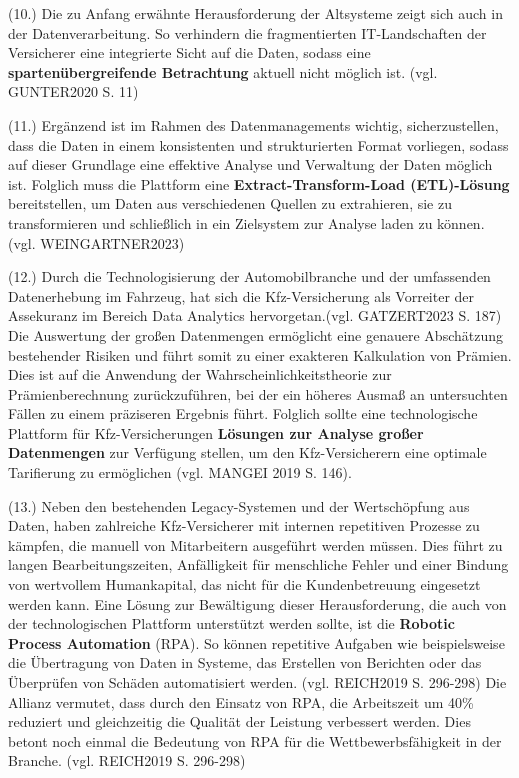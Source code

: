 (10.) Die zu Anfang erwähnte Herausforderung der Altsysteme zeigt sich auch in der Datenverarbeitung. So verhindern die fragmentierten IT-Landschaften der Versicherer eine integrierte Sicht auf die Daten, sodass eine \textbf{spartenübergreifende Betrachtung} aktuell nicht möglich ist. (vgl. GUNTER2020 S. 11)

(11.) Ergänzend ist im Rahmen des Datenmanagements wichtig, sicherzustellen, dass die Daten in einem konsistenten und strukturierten Format vorliegen, sodass auf dieser Grundlage eine effektive Analyse und Verwaltung der Daten möglich ist. Folglich muss die Plattform eine \textbf{Extract-Transform-Load (ETL)-Lösung} bereitstellen, um Daten aus verschiedenen Quellen zu extrahieren, sie zu transformieren und schließlich in ein Zielsystem zur Analyse laden zu können. (vgl. WEINGARTNER2023)

(12.) Durch die Technologisierung der Automobilbranche und der umfassenden Datenerhebung im Fahrzeug, hat sich die Kfz-Versicherung als Vorreiter der Assekuranz im Bereich Data Analytics hervorgetan.(vgl. GATZERT2023 S. 187) Die Auswertung der großen Datenmengen ermöglicht eine genauere Abschätzung bestehender Risiken und führt somit zu einer exakteren Kalkulation von Prämien. Dies ist auf die Anwendung der Wahrscheinlichkeitstheorie zur Prämienberechnung zurückzuführen, bei der ein höheres Ausmaß an untersuchten Fällen zu einem präziseren Ergebnis führt. Folglich sollte eine technologische Plattform für Kfz-Versicherungen \textbf{Lösungen zur Analyse großer Datenmengen} zur Verfügung stellen, um den Kfz-Versicherern eine optimale Tarifierung zu ermöglichen (vgl. MANGEI 2019 S. 146). 

(13.) Neben den bestehenden Legacy-Systemen und der Wertschöpfung aus Daten, haben zahlreiche Kfz-Versicherer mit internen repetitiven Prozesse zu kämpfen, die manuell von Mitarbeitern ausgeführt werden müssen. Dies führt zu langen Bearbeitungszeiten, Anfälligkeit für menschliche Fehler und einer Bindung von wertvollem Humankapital, das nicht für die Kundenbetreuung eingesetzt werden kann. Eine Lösung zur Bewältigung dieser Herausforderung, die auch von der technologischen Plattform unterstützt werden sollte, ist die \textbf{Robotic Process Automation} (RPA). So können repetitive Aufgaben wie beispielsweise die Übertragung von Daten in Systeme, das Erstellen von Berichten oder das Überprüfen von Schäden automatisiert werden. (vgl. REICH2019 S. 296-298)  Die Allianz vermutet, dass durch den Einsatz von RPA, die Arbeitszeit um 40\% reduziert und gleichzeitig die Qualität der Leistung verbessert werden. Dies betont noch einmal die Bedeutung von RPA für die Wettbewerbsfähigkeit in der Branche. (vgl. REICH2019 S. 296-298) 

